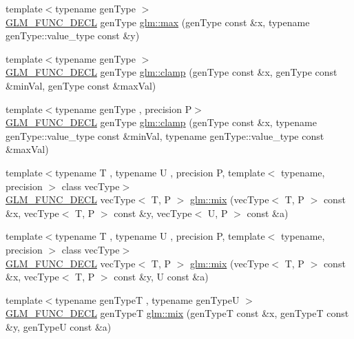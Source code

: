 \begin{DoxyCompactItemize}
\item 
{\footnotesize template$<$typename gen\+Type $>$ }\\\hyperlink{setup_8hpp_ab2d052de21a70539923e9bcbf6e83a51}{G\+L\+M\+\_\+\+F\+U\+N\+C\+\_\+\+D\+E\+CL} gen\+Type \hyperlink{group__core__func__common_ga30077cf0de58a7474450fb328ba456d7}{glm\+::max} (gen\+Type const \&x, typename gen\+Type\+::value\+\_\+type const \&y)
\item 
{\footnotesize template$<$typename gen\+Type $>$ }\\\hyperlink{setup_8hpp_ab2d052de21a70539923e9bcbf6e83a51}{G\+L\+M\+\_\+\+F\+U\+N\+C\+\_\+\+D\+E\+CL} gen\+Type \hyperlink{group__core__func__common_ga72e9e213c84f06a329a2a838b51200f4}{glm\+::clamp} (gen\+Type const \&x, gen\+Type const \&min\+Val, gen\+Type const \&max\+Val)
\item 
{\footnotesize template$<$typename gen\+Type , precision P$>$ }\\\hyperlink{setup_8hpp_ab2d052de21a70539923e9bcbf6e83a51}{G\+L\+M\+\_\+\+F\+U\+N\+C\+\_\+\+D\+E\+CL} gen\+Type \hyperlink{group__core__func__common_ga5409c55a5f3aaae3e02ed440a47380bb}{glm\+::clamp} (gen\+Type const \&x, typename gen\+Type\+::value\+\_\+type const \&min\+Val, typename gen\+Type\+::value\+\_\+type const \&max\+Val)
\item 
{\footnotesize template$<$typename T , typename U , precision P, template$<$ typename, precision $>$ class vec\+Type$>$ }\\\hyperlink{setup_8hpp_ab2d052de21a70539923e9bcbf6e83a51}{G\+L\+M\+\_\+\+F\+U\+N\+C\+\_\+\+D\+E\+CL} vec\+Type$<$ T, P $>$ \hyperlink{group__core__func__common_gadccbaffe46f369cf1a96b2aef92cbfdd}{glm\+::mix} (vec\+Type$<$ T, P $>$ const \&x, vec\+Type$<$ T, P $>$ const \&y, vec\+Type$<$ U, P $>$ const \&a)
\item 
{\footnotesize template$<$typename T , typename U , precision P, template$<$ typename, precision $>$ class vec\+Type$>$ }\\\hyperlink{setup_8hpp_ab2d052de21a70539923e9bcbf6e83a51}{G\+L\+M\+\_\+\+F\+U\+N\+C\+\_\+\+D\+E\+CL} vec\+Type$<$ T, P $>$ \hyperlink{group__core__func__common_gaa5c83ada94113757c0a555ab4f40cd6e}{glm\+::mix} (vec\+Type$<$ T, P $>$ const \&x, vec\+Type$<$ T, P $>$ const \&y, U const \&a)
\item 
{\footnotesize template$<$typename gen\+TypeT , typename gen\+TypeU $>$ }\\\hyperlink{setup_8hpp_ab2d052de21a70539923e9bcbf6e83a51}{G\+L\+M\+\_\+\+F\+U\+N\+C\+\_\+\+D\+E\+CL} gen\+TypeT \hyperlink{group__core__func__common_ga78aae7eea618ca112053d59fe03db239}{glm\+::mix} (gen\+TypeT const \&x, gen\+TypeT const \&y, gen\+TypeU const \&a)

\end{DoxyCompactItemize}
